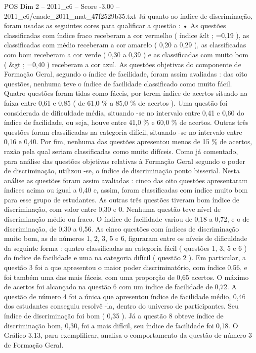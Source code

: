 \begin{textsample}{POS Dim 2 – 2011\_c6 – Score -3.00 – 2011\_c6/enade\_2011\_mat\_47f2529b35.txt}
Já quanto ao índice de discriminação, foram usadas as seguintes cores para qualificar a questão : • As questões classificadas com índice fraco receberam a cor vermelho ( índice \&lt ; =0,19 ), as classificadas com médio receberam a cor amarelo ( 0,20 a 0,29 ), as classificadas com bom receberam a cor verde ( 0,30 a 0,39 ) e as classificadas com muito bom ( \&gt ; =0,40 ) receberam a cor azul.
As questões objetivas do componente de Formação Geral, segundo o índice de facilidade, foram assim avaliadas : das oito questões, nenhuma teve o índice de facilidade classificado como muito fácil.
Quatro questões foram tidas como fáceis, por terem índice de acertos situado na faixa entre 0,61 e 0,85 ( de 61,0 \% a 85,0 \% de acertos ).
Uma questão foi considerada de dificuldade média, situando -se no intervalo entre 0,41 e 0,60 do índice de facilidade, ou seja, houve entre 41,0 \% e 60,0 \% de acertos.
Outras três questões foram classificadas na categoria difícil, situando -se no intervalo entre 0,16 e 0,40.
Por fim, nenhuma das questões apresentou menos de 15 \% de acertos, razão pela qual seriam classificadas como muito difíceis.
Como já comentado, para análise das questões objetivas relativas à Formação Geral segundo o poder de discriminação, utilizou -se, o índice de discriminação ponto bisserial.
Nesta análise as questões foram assim avaliadas : cinco das oito questões apresentaram índices acima ou igual a 0,40 e, assim, foram classificadas com índice muito bom para esse grupo de estudantes.
As outras três questões tiveram bom índice de discriminação, com valor entre 0,30 e 0.
Nenhuma questão teve nível de discriminação médio ou fraco.
O índice de facilidade variou de 0,18 a 0,72, e o de discriminação, de 0,30 a 0,56.
As cinco questões com índices de discriminação muito bom, as de números 1, 2, 3, 5 e 6, figuraram entre os níveis de dificuldade da seguinte forma : quatro classificadas na categoria fácil ( questões 1, 3, 5 e 6 ) do índice de facilidade e uma na categoria difícil ( questão 2 ).
Em particular, a questão 3 foi a que apresentou o maior poder discriminatório, com índice 0,56, e foi também uma das mais fáceis, com uma proporção de 0,65 acertos.
O máximo de acertos foi alcançado na questão 6 com um índice de facilidade de 0,72.
A questão de número 4 foi a única que apresentou índice de facilidade médio, 0,46 dos estudantes conseguiu resolvê -la, dentro do universo de participantes.
Seu índice de discriminação foi bom ( 0,35 ).
Já a questão 8 obteve índice de discriminação bom, 0,30, foi a mais difícil, seu índice de facilidade foi 0,18.
O Gráfico 3.13, para exemplificar, analisa o comportamento da questão de número 3 de Formação Geral.

\end{textsample}
